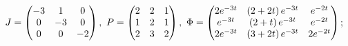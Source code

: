 \begin{enumsolsfull}
		\item \( J = \begin{pmatrix} -3 & 1 & 0 \\ 0 & -3 & 0 \\ 0 & 0 & -2 \end{pmatrix}, ~ P = \begin{pmatrix} 2 & 2 & 1 \\ 1 & 2 & 1 \\ 2 & 3 & 2 \end{pmatrix}, ~ \Phi = \begin{pmatrix} 2e^{-3t} & \left( 2 + 2t \right)e^{-3t} & e^{-2t} \\ e^{-3t} & \left( 2+t \right) e^{-3t} & e^{-2t} \\ 2e^{-3t} & \left( 3 + 2t \right)e^{-3t} & 2e^{-2t} \end{pmatrix} \); %

\end{enumsolsfull}

